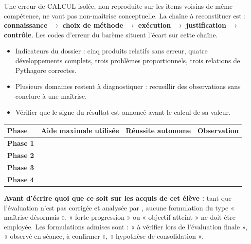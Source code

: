\documentclass[10pt,a4paper]{article}
\begin{document}
Une erreur de \textsc{CALCUL} isolée, non reproduite sur les items voisins de même compétence, ne vaut pas non-maîtrise conceptuelle. La chaîne à reconstituer est : \textbf{connaissance} $\rightarrow$ \textbf{choix de méthode} $\rightarrow$ \textbf{exécution} $\rightarrow$ \textbf{justification} $\rightarrow$ \textbf{contrôle}. Les codes d'erreur du barème situent l'écart sur cette chaîne.
\begin{itemize}\item Indicateurs du dossier : cinq produits relatifs sans erreur, quatre développements complets, trois problèmes proportionnels, trois relations de Pythagore correctes.\item Plusieurs domaines restent à diagnostiquer : recueillir des observations sans conclure à une maîtrise.\item Vérifier que le signe du résultat est annoncé avant le calcul de sa valeur.\end{itemize}
\par\noindent\begin{tabularx}{\linewidth}{>{\bfseries}p{26mm} X X X}
\toprule Phase & Aide maximale utilisée & Réussite autonome & Observation \\ \midrule
Phase 1 & & & \\[6mm]
Phase 2 & & & \\[6mm]
Phase 3 & & & \\[6mm]
Phase 4 & & & \\[6mm]
\bottomrule\end{tabularx}
\begin{warningbox}\textbf{Avant d'écrire quoi que ce soit sur les acquis de cet élève :} tant que l'évaluation n'est pas corrigée et analysée par , aucune formulation du type « maîtrise désormais », « forte progression » ou « objectif atteint » ne doit être employée. Les formulations admises sont : « à vérifier lors de l'évaluation finale », « observé en séance, à confirmer », « hypothèse de consolidation ».\end{warningbox}
\end{document}
